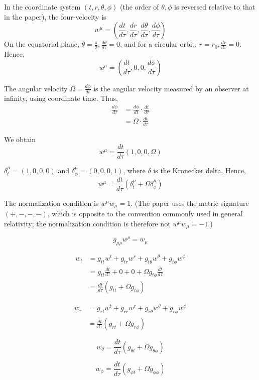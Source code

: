 \documentclass[english]{article}
\begin{document}
In the coordinate system $\left(t,r,\theta,\phi\right)$ (the order
of $\theta,\phi$ is reversed relative to that in the paper), the
four-velocity is 
\[
w^{\mu}=\left(\frac{dt}{d\tau},\frac{dr}{d\tau},\frac{d\theta}{d\tau},\frac{d\phi}{d\tau}\right)
\]
 On the equatorial plane, $\theta=\frac{\pi}{2},\frac{d\theta}{d\tau}=0$,
and for a circular orbit, $r=r_{0},\frac{dr}{d\tau}=0$. Hence, 
\[
w^{\mu}=\left(\frac{dt}{d\tau},0,0,\frac{d\phi}{d\tau}\right)
\]

The angular velocity $\Omega=\frac{d\phi}{dt}$ is the angular velocity
measured by an observer at infinity, using coordinate time. Thus,
\begin{align*}
\frac{d\phi}{d\tau} & =\frac{d\phi}{dt}\cdot\frac{dt}{d\tau}\\
 & =\Omega\cdot\frac{dt}{d\tau}
\end{align*}

We obtain 
\[
w^{\mu}=\frac{dt}{d\tau}\left(1,0,0,\Omega\right)
\]

$\delta^{\mu}_{\!t}=\left(1,0,0,0\right)$ and $\delta^{\mu}_{\!\phi}=\left(0,0,0,1\right)$,
where $\delta$ is the Kronecker delta. Hence, 
\[
w^{\mu}=\frac{dt}{d\tau}\left(\delta^{\mu}_{\!t}+\Omega\delta^{\mu}_{\!\phi}\right)
\]

The normalization condition is $w^{\mu}w_{\mu}=1$. (The paper uses
the metric signature $(+,-,-,-)$, which is opposite to the convention
commonly used in general relativity; the normalization condition is
therefore not $w^{\mu}w_{\mu}=-1$.)

\[
g_{\mu\rho}w^{\rho}=w_{\mu}
\]

\begin{align*}
w_{t} & =g_{tt}w^{t}+g_{tr}w^{r}+g_{t\theta}w^{\theta}+g_{t\phi}w^{\phi}\\
 & =g_{tt}\frac{dt}{d\tau}+0+0+\Omega g_{t\phi}\frac{dt}{d\tau}\\
 & =\frac{dt}{d\tau}\left(g_{tt}+\Omega g_{t\phi}\right)
\end{align*}

\begin{align*}
w_{r} & =g_{rt}w^{t}+g_{rr}w^{r}+g_{r\theta}w^{\theta}+g_{r\phi}w^{\phi}\\
 & =\frac{dt}{d\tau}\left(g_{rt}+\Omega g_{r\phi}\right)
\end{align*}

\[
w_{\theta}=\frac{dt}{d\tau}\left(g_{\theta t}+\Omega g_{\theta\phi}\right)
\]

\[
w_{\phi}=\frac{dt}{d\tau}\left(g_{\phi t}+\Omega g_{\phi\phi}\right)
\]
\end{document}

